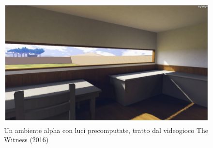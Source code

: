 \\
\begin{figure}[htb]
 \centering
 \includegraphics[width=0.8\linewidth]{images/chapter_stato_arte/stato_arte_lightmap_witness.png}\hfill
 \caption[Lightmap The Witness]{Un ambiente alpha con luci precomputate, tratto dal videogioco The Witness (2016)}
 \label{fig:stato_arte_lightmap_witness}
\end{figure}
